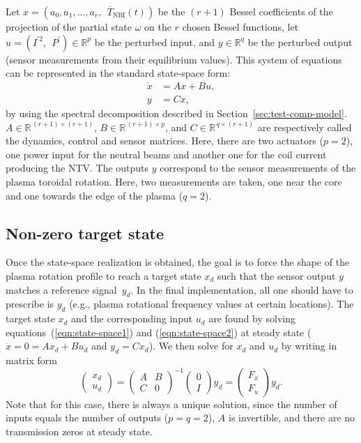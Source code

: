 \documentclass[12pt,lot, lof]{puthesis}
\begin{document}
%
Let $x = \left( a_{0}, a_{1}, ..., a_{r} , \ \ \overline{T}_\text{NBI}(t) \right)$ be the $(r+1)$ Bessel coefficients of the projection of the partial state $ \omega$ on the $r$ chosen Bessel functions,
let $u = ( I^{'2}, \ \  P^{'} ) \in \mathbb{R}^p$ be the perturbed input,
and $y \in \mathbb{R}^q$ be the perturbed output (sensor measurements from their equilibrium values).
%
This system of equations can be represented in the standard state-space form:
\begin{align}
	\dot{x} &= A x + B u, \label{eqn:state-space1} \\
	y &= C x, \label{eqn:state-space2} 
\end{align}
by using the spectral decomposition described in Section~\ref{sec:test-comp-model}.
$A \in \mathbb{R}^{\, (r+1) \times (r+1)}$, $B \in \mathbb{R}^{\,(r+1) \times p}$, and $C \in \mathbb{R}^{\, q \times (r+1)}$ are respectively called the dynamics, control and sensor matrices.
Here, there are two actuators ($p=2$), one power input for the neutral beams and another one for the coil current producing the NTV.
The outputs $y$ correspond to the sensor measurements of the plasma toroidal rotation. Here, two measurements are taken, one near the core and one towards the edge of the plasma ($q=2$).
%
\subsection{Non-zero target state}
Once the state-space realization is obtained, the goal is to force the shape of the plasma rotation profile to reach a target state $x_d$ such that the sensor output $y$ matches a reference signal~$y_d$. In the final implementation, all one should have to prescribe is $y_d$ (e.g., plasma rotational frequency values at certain locations). The target state $x_d$ and the corresponding input $u_d$ are found by solving equations~(\ref{eqn:state-space1}) and (\ref{eqn:state-space2}) at steady state ($\dot x = 0 = A x_d + B u_d$ and $y_d = C x_d$).
%
We then solve for $x_d$ and $u_d$ by writing in matrix form
\begin{equation}
\left(\! \begin{array}{c}  x_{d} \\ u_{d}\end{array}\!\right)
  ={ \left(\! \begin{array}{cc} A  & B \\ C & 0 \end{array} \! \right)}^{-1} \left(\! \begin{array}{c} 0 \\ I    \end{array}  \!\right) y_{d} = \left(\! \begin{array}{c} F_x \\ F_u    \end{array}  \!\right) y_{d}.
\label{steadystate}
\end{equation}
Note that for this case, there is always a unique solution, since the number of inputs equals the number of outputs ($p = q = 2$), $A$ is invertible, and there are no transmission zeros at steady state.
\end{document}
